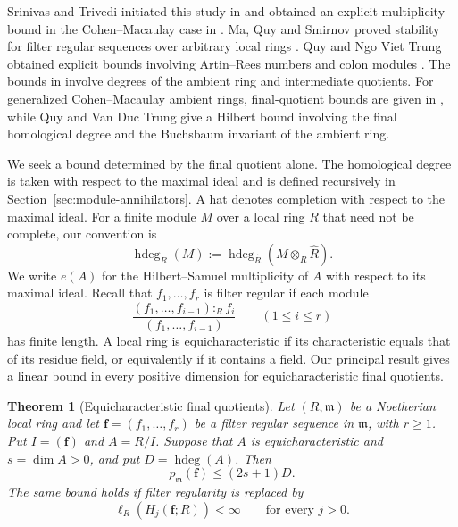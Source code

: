\documentclass[11pt,reqno]{amsart}
\numberwithin{equation}{section}
\newtheorem{theorem}{Theorem}[section]
\theoremstyle{definition}
\newcommand{\m}{\mathfrak m}
\newcommand{\f}{\mathbf f}
\newcommand{\hdeg}{\operatorname{hdeg}}
\begin{document}
Srinivas and Trivedi initiated this study in
\cite[Theorem~3 and Corollary~5]{ST96} and obtained an explicit
multiplicity bound in the Cohen--Macaulay case in
\cite[Proposition~1]{ST97}. Ma, Quy and Smirnov proved stability for
filter regular sequences over arbitrary local rings
\cite[Theorem~3.5]{MQS}. Quy and Ngo Viet Trung obtained explicit
bounds involving Artin--Rees numbers and colon modules
\cite[Theorem~3.5]{QT}. The bounds in \cite[Theorem~4.5]{QT} involve degrees of the
ambient ring and intermediate quotients. For generalized
Cohen--Macaulay ambient rings, final-quotient bounds are given in
\cite[Corollary~4.8]{QT}, while Quy and Van Duc Trung
\cite[Theorem~1.4]{QVT} give a Hilbert bound involving the final
homological degree and the Buchsbaum invariant of the ambient ring.

We seek a bound determined by the final quotient alone.
The homological degree is taken with respect to the maximal ideal and
is defined recursively in Section~\ref{sec:module-annihilators}.
A hat denotes completion with respect to the maximal ideal. For a finite
module $M$ over a local ring $R$ that need not be complete, our convention is
\[
 \hdeg_R(M):=\hdeg_{\widehat R}(M\otimes_R\widehat R).
\]
We write $e(A)$ for the Hilbert--Samuel multiplicity of $A$ with respect
to its maximal ideal. Recall that $f_1,\ldots,f_r$ is filter regular if
each module
\[
 \frac{(f_1,\ldots,f_{i-1}):_R f_i}{(f_1,\ldots,f_{i-1})}
 \qquad(1\le i\le r)
\]
has finite length. A local ring is equicharacteristic if its
characteristic equals that of its residue field, or equivalently if
it contains a field. Our principal result gives a linear bound in every
positive dimension for equicharacteristic final quotients.

\begin{theorem}[Equicharacteristic final quotients]
\label{thm:equicharacteristic}
Let $(R,\m)$ be a Noetherian local ring and let $\f=(f_1,\ldots,f_r)$
be a filter regular sequence in $\m$, with $r\ge1$.
Put $I=(\f)$ and $A=R/I$. Suppose that $A$ is equicharacteristic and
$s=\dim A>0$, and put $D=\hdeg(A)$. Then
\begin{equation}\label{eq:equicharacteristic-main}
 p_{\m}(\f)\le (2s+1)D.
\end{equation}
The same bound holds if filter regularity is replaced by
\begin{equation}\label{eq:koszul-hypothesis}
 \ell_R(H_j(\f;R))<\infty\qquad\text{for every }j>0.
\end{equation}
\end{theorem}
\end{document}
